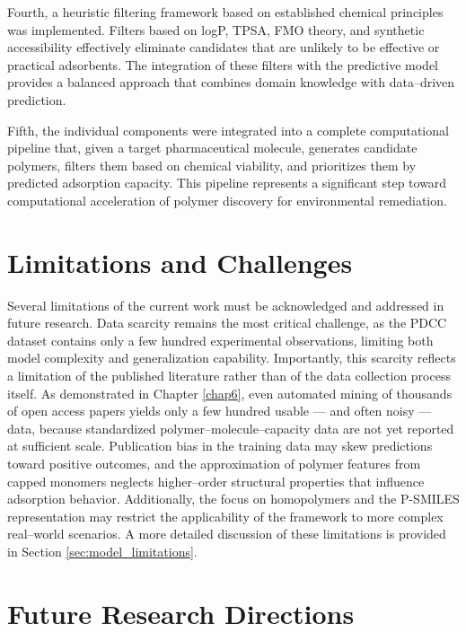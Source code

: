 Fourth, a heuristic filtering framework based on established chemical principles was implemented. Filters based on logP, TPSA, FMO theory, and synthetic accessibility effectively eliminate candidates that are unlikely to be effective or practical adsorbents. The integration of these filters with the predictive model provides a balanced approach that combines domain knowledge with data--driven prediction.

Fifth, the individual components were integrated into a complete computational pipeline that, given a target pharmaceutical molecule, generates candidate polymers, filters them based on chemical viability, and prioritizes them by predicted adsorption capacity. This pipeline represents a significant step toward computational acceleration of polymer discovery for environmental remediation.

\section{Limitations and Challenges}
\label{sec:limitations}

Several limitations of the current work must be acknowledged and addressed in future research. Data scarcity remains the most critical challenge, as the PDCC dataset contains only a few hundred experimental observations, limiting both model complexity and generalization capability. Importantly, this scarcity reflects a limitation of the published literature rather than of the data collection process itself. As demonstrated in Chapter \ref{chap6}, even automated mining of thousands of open access papers yields only a few hundred usable --- and often noisy --- data, because standardized polymer--molecule--capacity data are not yet reported at sufficient scale. Publication bias in the training data may skew predictions toward positive outcomes, and the approximation of polymer features from capped monomers neglects higher--order structural properties that influence adsorption behavior. Additionally, the focus on homopolymers and the P-SMILES representation may restrict the applicability of the framework to more complex real--world scenarios. A more detailed discussion of these limitations is provided in Section \ref{sec:model_limitations}.

\section{Future Research Directions}
\label{sec:future_directions}

